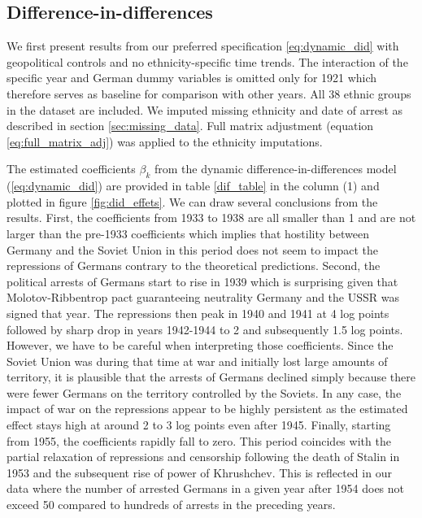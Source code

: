 \subsection{Difference-in-differences}
We first present results from our preferred specification \ref{eq:dynamic_did} with geopolitical controls and no ethnicity-specific time trends. 
The interaction of the specific year and German dummy variables is omitted only for 1921 which therefore serves as baseline for comparison with other years. 
All 38 ethnic groups in the dataset are included. 
We imputed missing ethnicity and date of arrest as described in section \ref{sec:missing_data}.  Full matrix adjustment (equation \ref{eq:full_matrix_adj}) was applied to the ethnicity imputations. 

 The estimated coefficients  $\beta_k$ from the dynamic difference-in-differences model (\ref{eq:dynamic_did}) are provided in table \ref{dif_table} in the column (1) and  plotted in figure \ref{fig:did_effets}.
 We can draw several conclusions from the results. 
 First, the coefficients from 1933 to 1938 are all smaller than 1 and
 are not larger than the pre-1933 coefficients
 which implies that hostility between Germany and the Soviet Union in this period does not seem to impact the repressions of Germans contrary to the theoretical predictions. Second, the political arrests of Germans start to rise in 1939 which is surprising given that  Molotov-Ribbentrop pact guaranteeing neutrality Germany and the USSR was signed that year. The repressions then peak  in 1940 and 1941  at 4 log points
  followed by sharp drop in years 1942-1944 to 2 and subsequently 1.5 log points. 
  However,  we have to be careful when interpreting those coefficients. 
 Since the Soviet Union was during that time at war and initially lost large amounts of territory, it is plausible that the arrests of Germans  declined simply because there were fewer Germans on the territory controlled by the Soviets. 
 In any case,  the impact of war on the repressions appear to be highly persistent as 
  the estimated effect stays high at around 2 to 3 log points even after 1945.
Finally,  starting from 1955, the coefficients rapidly fall to zero. 
This period coincides with the partial relaxation of repressions and censorship following the death of Stalin in 1953 and the subsequent  rise of power of Khrushchev. 
This is reflected in our data where the number of arrested Germans in a given year after 1954 does not exceed 50 compared to hundreds of arrests in the preceding years. 

